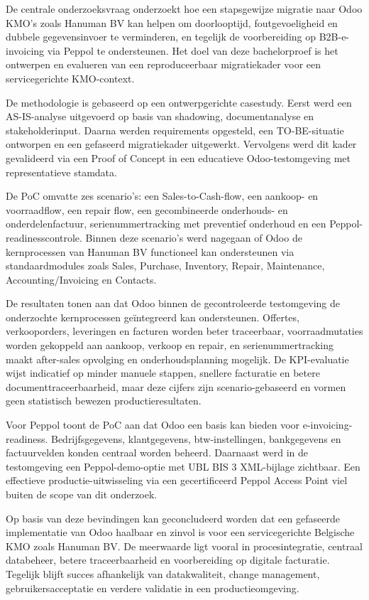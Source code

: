 De centrale onderzoeksvraag onderzoekt hoe een stapsgewijze migratie naar Odoo KMO's zoals Hanuman BV kan helpen om doorlooptijd, foutgevoeligheid en dubbele gegevensinvoer te verminderen, en tegelijk de voorbereiding op B2B-e-invoicing via Peppol te ondersteunen. Het doel van deze bachelorproef is het ontwerpen en evalueren van een reproduceerbaar migratiekader voor een servicegerichte KMO-context.

De methodologie is gebaseerd op een ontwerpgerichte casestudy. Eerst werd een AS-IS-analyse uitgevoerd op basis van shadowing, documentanalyse en stakeholderinput. Daarna werden requirements opgesteld, een TO-BE-situatie ontworpen en een gefaseerd migratiekader uitgewerkt. Vervolgens werd dit kader gevalideerd via een Proof of Concept in een educatieve Odoo-testomgeving met representatieve stamdata.

De PoC omvatte zes scenario's: een Sales-to-Cash-flow, een aankoop- en voorraadflow, een repair flow, een gecombineerde onderhouds- en onderdelenfactuur, serienummertracking met preventief onderhoud en een Peppol-readinesscontrole. Binnen deze scenario's werd nagegaan of Odoo de kernprocessen van Hanuman BV functioneel kan ondersteunen via standaardmodules zoals Sales, Purchase, Inventory, Repair, Maintenance, Accounting/Invoicing en Contacts.

De resultaten tonen aan dat Odoo binnen de gecontroleerde testomgeving de onderzochte kernprocessen geïntegreerd kan ondersteunen. Offertes, verkooporders, leveringen en facturen worden beter traceerbaar, voorraadmutaties worden gekoppeld aan aankoop, verkoop en repair, en serienummertracking maakt after-sales opvolging en onderhoudsplanning mogelijk. De KPI-evaluatie wijst indicatief op minder manuele stappen, snellere facturatie en betere documenttraceerbaarheid, maar deze cijfers zijn scenario-gebaseerd en vormen geen statistisch bewezen productieresultaten.

Voor Peppol toont de PoC aan dat Odoo een basis kan bieden voor e-invoicing-readiness. Bedrijfsgegevens, klantgegevens, btw-instellingen, bankgegevens en factuurvelden konden centraal worden beheerd. Daarnaast werd in de testomgeving een Peppol-demo-optie met UBL BIS 3 XML-bijlage zichtbaar. Een effectieve productie-uitwisseling via een gecertificeerd Peppol Access Point viel buiten de scope van dit onderzoek.

Op basis van deze bevindingen kan geconcludeerd worden dat een gefaseerde implementatie van Odoo haalbaar en zinvol is voor een servicegerichte Belgische KMO zoals Hanuman BV. De meerwaarde ligt vooral in procesintegratie, centraal databeheer, betere traceerbaarheid en voorbereiding op digitale facturatie. Tegelijk blijft succes afhankelijk van datakwaliteit, change management, gebruikersacceptatie en verdere validatie in een productieomgeving.